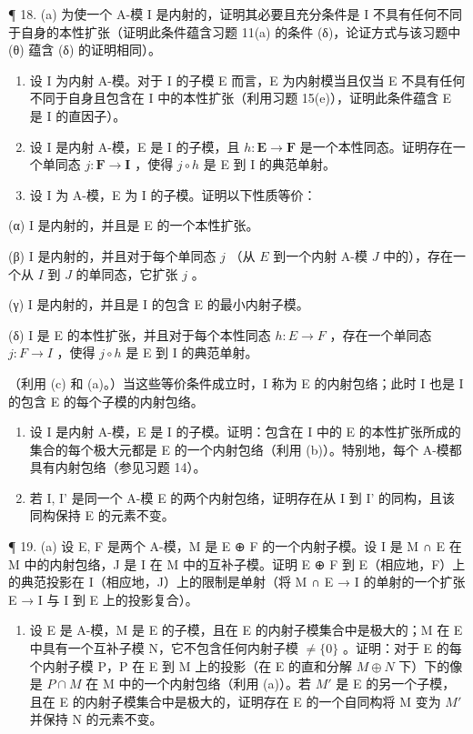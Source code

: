 ¶ 18. (a) 为使一个 A-模 I 是内射的，证明其必要且充分条件是 I 不具有任何不同于自身的本性扩张（证明此条件蕴含习题 11(a) 的条件 (δ)，论证方式与该习题中 (θ) 蕴含 (δ) 的证明相同）。

\begin{enumerate}
\def\labelenumi{(\alph{enumi})}
\setcounter{enumi}{1}
\item
  设 I 为内射 A-模。对于 I 的子模 E 而言，E 为内射模当且仅当 E 不具有任何不同于自身且包含在 I 中的本性扩张（利用习题 15(e)），证明此条件蕴含 E 是 I 的直因子）。
\item
  设 I 是内射 A-模，E 是 I 的子模，且 \(h: \mathbf{E} \to \mathbf{F}\) 是一个本性同态。证明存在一个单同态 \(j: \mathbf{F} \to \mathbf{I}\) ，使得 \(j \circ h\) 是 E 到 I 的典范单射。
\item
  设 I 为 A-模，E 为 I 的子模。证明以下性质等价：
\end{enumerate}

(α) I 是内射的，并且是 E 的一个本性扩张。

(β) I 是内射的，并且对于每个单同态 \(j\) （从 \(E\) 到一个内射 A-模 \(J\) 中的），存在一个从 \(I\) 到 \(J\) 的单同态，它扩张 \(j\) 。

(γ) I 是内射的，并且是 I 的包含 E 的最小内射子模。

(δ) I 是 E 的本性扩张，并且对于每个本性同态 \(h: E \to F\) ，存在一个单同态 \(j: F \to I\) ，使得 \(j \circ h\) 是 E 到 I 的典范单射。

（利用 (c) 和 (a)。）当这些等价条件成立时，I 称为 E 的内射包络；此时 I 也是 I 的包含 E 的每个子模的内射包络。

\begin{enumerate}
\def\labelenumi{(\alph{enumi})}
\setcounter{enumi}{4}
\item
  设 I 是内射 A-模，E 是 I 的子模。证明：包含在 I 中的 E 的本性扩张所成的集合的每个极大元都是 E 的一个内射包络（利用 (b)）。特别地，每个 A-模都具有内射包络（参见习题 14）。
\item
  若 I, I' 是同一个 A-模 E 的两个内射包络，证明存在从 I 到 I' 的同构，且该同构保持 E 的元素不变。
\end{enumerate}

¶ 19. (a) 设 E, F 是两个 A-模，M 是 E ⊕ F 的一个内射子模。设 I 是 M ∩ E 在 M 中的内射包络，J 是 I 在 M 中的互补子模。证明 E ⊕ F 到 E（相应地，F）上的典范投影在 I（相应地，J）上的限制是单射（将 M ∩ E → I 的单射的一个扩张 E → I 与 I 到 E 上的投影复合）。

\begin{enumerate}
\def\labelenumi{(\alph{enumi})}
\setcounter{enumi}{1}
\tightlist
\item
  设 E 是 A-模，M 是 E 的子模，且在 E 的内射子模集合中是极大的；M 在 E 中具有一个互补子模 N，它不包含任何内射子模 \(\neq\{0\}\) 。证明：对于 E 的每个内射子模 P，P 在 E 到 M 上的投影（在 E 的直和分解 \(M \oplus N\) 下）下的像是 \(P \cap M\) 在 M 中的一个内射包络（利用 (a)）。若 \(M'\) 是 E 的另一个子模，且在 E 的内射子模集合中是极大的，证明存在 E 的一个自同构将 M 变为 \(M'\) 并保持 N 的元素不变。
\end{enumerate}

